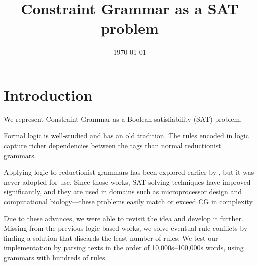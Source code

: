 \documentclass[11pt]{article}
\title{Constraint Grammar as a SAT problem}
\date{\today}
\begin{document}
\maketitle



\section{Introduction}

We represent Constraint Grammar \cite{karlsson1995constraint} 
as a Boolean satisfiability (SAT) problem.

Formal logic is well-studied and has an old tradition.
The rules encoded in logic capture richer dependencies between the
tags than normal reductionist grammars.

Applying logic to reductionist grammars has been explored earlier by 
\cite{lager98,lager_nivre01}, but it was never adopted for use.
Since those works, SAT solving techniques have improved significantly, and 
they are used in domains such as microprocessor design and computational 
biology---these problems easily match or exceed CG in complexity. 

Due to these advances, we were able to revisit the idea and develop it further. 
Missing from the previous logic-based works, 
we solve eventual rule conflicts by finding a solution that 
discards the least number of rules.
We test our implementation by parsing texts in the order of 10,000s--100,000s
words, using grammars with hundreds of rules.







\end{document}
